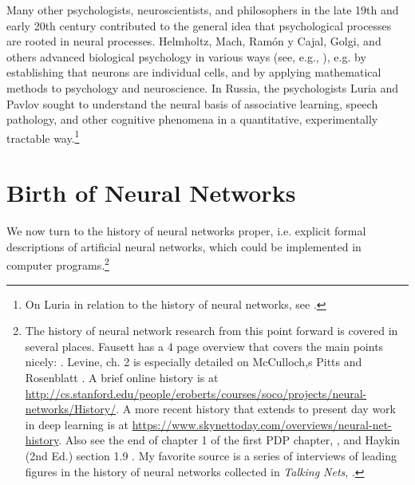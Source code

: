 Many other psychologists, neuroscientists, and philosophers in the late 19th and early 20th century contributed to the general idea that psychological processes are rooted in neural processes. Helmholtz, Mach, Ram{\'o}n y Cajal, Golgi, and others advanced biological psychology in various ways (see, e.g., \cite{boring1929history}), e.g. by establishing that neurons are individual cells, and by applying mathematical methods to psychology and neuroscience. In Russia, the psychologists Luria and Pavlov sought to understand the neural basis of associative learning, speech pathology, and other cognitive phenomena in a quantitative, experimentally tractable way.\footnote{On Luria in relation to the history of neural networks, see \cite[p. 41]{rumelhart1986parallel}.}

\section{Birth of Neural Networks}

We now turn to the history of neural networks proper, i.e. explicit formal descriptions of artificial neural networks, which could be implemented in computer programs.\footnote{The history of neural network research from this point forward is covered in several places. Fausett has a 4 page overview that covers the main points nicely:  \cite[pp. 22-26]{fausett1994fundamentals}. Levine, ch. 2 is especially detailed on McCulloch,s Pitts and Rosenblatt \cite{levine2000introduction}. A brief online history is at \url{http://cs.stanford.edu/people/eroberts/courses/soco/projects/neural-networks/History/}. A more recent history that extends to present day work in deep learning is at \url{https://www.skynettoday.com/overviews/neural-net-history}. Also see the end of chapter 1 of the first PDP chapter, \cite{rumelhart1986parallel}, and Haykin (2nd Ed.) section 1.9 \cite{haykin1998neural}. My favorite source is a series of interviews of leading figures in the history of neural networks collected in \emph{Talking Nets}, \cite{anderson2000talking}.} 

